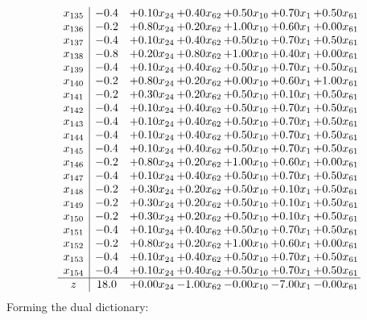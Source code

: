 \documentclass[8pt]{article}
\begin{document}
\[\begin{array}{c| c c@{\hskip 2pt} c@{\hskip 2pt} c@{\hskip 2pt} c@{\hskip 2pt} c@{\hskip 2pt} }
 x_{135}   &  -0.4 & +  0.10 x_{24} & +  0.40 x_{62} & +  0.50 x_{10} & +  0.70 x_{1} & +  0.50 x_{61}\\
 x_{136}   &  -0.2 & +  0.80 x_{24} & +  0.20 x_{62} & +  1.00 x_{10} & +  0.60 x_{1} & +  0.00 x_{61}\\
 x_{137}   &  -0.4 & +  0.10 x_{24} & +  0.40 x_{62} & +  0.50 x_{10} & +  0.70 x_{1} & +  0.50 x_{61}\\
 x_{138}   &  -0.8 & +  0.20 x_{24} & +  0.80 x_{62} & +  1.00 x_{10} & +  0.40 x_{1} & +  0.00 x_{61}\\
 x_{139}   &  -0.4 & +  0.10 x_{24} & +  0.40 x_{62} & +  0.50 x_{10} & +  0.70 x_{1} & +  0.50 x_{61}\\
 x_{140}   &  -0.2 & +  0.80 x_{24} & +  0.20 x_{62} & +  0.00 x_{10} & +  0.60 x_{1} & +  1.00 x_{61}\\
 x_{141}   &  -0.2 & +  0.30 x_{24} & +  0.20 x_{62} & +  0.50 x_{10} & +  0.10 x_{1} & +  0.50 x_{61}\\
 x_{142}   &  -0.4 & +  0.10 x_{24} & +  0.40 x_{62} & +  0.50 x_{10} & +  0.70 x_{1} & +  0.50 x_{61}\\
 x_{143}   &  -0.4 & +  0.10 x_{24} & +  0.40 x_{62} & +  0.50 x_{10} & +  0.70 x_{1} & +  0.50 x_{61}\\
 x_{144}   &  -0.4 & +  0.10 x_{24} & +  0.40 x_{62} & +  0.50 x_{10} & +  0.70 x_{1} & +  0.50 x_{61}\\
 x_{145}   &  -0.4 & +  0.10 x_{24} & +  0.40 x_{62} & +  0.50 x_{10} & +  0.70 x_{1} & +  0.50 x_{61}\\
 x_{146}   &  -0.2 & +  0.80 x_{24} & +  0.20 x_{62} & +  1.00 x_{10} & +  0.60 x_{1} & +  0.00 x_{61}\\
 x_{147}   &  -0.4 & +  0.10 x_{24} & +  0.40 x_{62} & +  0.50 x_{10} & +  0.70 x_{1} & +  0.50 x_{61}\\
 x_{148}   &  -0.2 & +  0.30 x_{24} & +  0.20 x_{62} & +  0.50 x_{10} & +  0.10 x_{1} & +  0.50 x_{61}\\
 x_{149}   &  -0.2 & +  0.30 x_{24} & +  0.20 x_{62} & +  0.50 x_{10} & +  0.10 x_{1} & +  0.50 x_{61}\\
 x_{150}   &  -0.2 & +  0.30 x_{24} & +  0.20 x_{62} & +  0.50 x_{10} & +  0.10 x_{1} & +  0.50 x_{61}\\
 x_{151}   &  -0.4 & +  0.10 x_{24} & +  0.40 x_{62} & +  0.50 x_{10} & +  0.70 x_{1} & +  0.50 x_{61}\\
 x_{152}   &  -0.2 & +  0.80 x_{24} & +  0.20 x_{62} & +  1.00 x_{10} & +  0.60 x_{1} & +  0.00 x_{61}\\
 x_{153}   &  -0.4 & +  0.10 x_{24} & +  0.40 x_{62} & +  0.50 x_{10} & +  0.70 x_{1} & +  0.50 x_{61}\\
 x_{154}   &  -0.4 & +  0.10 x_{24} & +  0.40 x_{62} & +  0.50 x_{10} & +  0.70 x_{1} & +  0.50 x_{61}\\
\hline
z    &  18.0 & +  0.00 x_{24} & -1.00 x_{62} & -0.00 x_{10} & -7.00 x_{1} & -0.00 x_{61}\\
\end{array}\]
Forming the dual dictionary:
\end{document}
